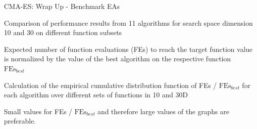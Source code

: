 \documentclass[11pt,compress,t,notes=noshow, xcolor=table]{beamer}
\begin{document}
\begin{framev}[fs=footnotesize]{CMA-ES: Wrap Up - Benchmark EAs}
\begin{itemizeS}
\item Comparison of performance results from 11 algorithms for search space dimension 10 and 30 on different function subsets
\item Expected number of function evaluations (FEs) to reach the target function value is normalized by the value of the best algorithm on the respective function $\text{FEs}_{best}$
\item Calculation of the empirical cumulative distribution function of FEs / $\text{FEs}_{best}$ for each algorithm over different sets of functions in 10 and 30D
\item Small values for FEs / $\text{FEs}_{best}$ and therefore large values of the graphs are preferable.
\end{itemizeS}
\end{framev}

\endlecture
\end{document}
